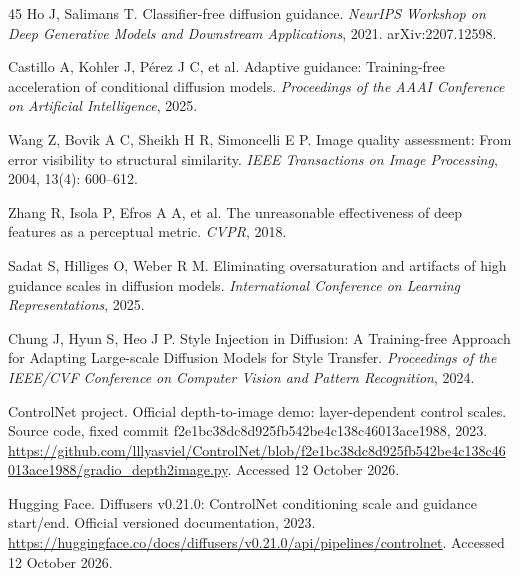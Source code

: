 \documentclass[times,twocolumn,final]{elsarticle}
\begin{document}
\begin{thebibliography}{45}
Ho J, Salimans T. Classifier-free diffusion guidance. \textit{NeurIPS Workshop on Deep Generative Models and Downstream Applications}, 2021. arXiv:2207.12598.

Castillo A, Kohler J, P\'erez J C, et al. Adaptive guidance: Training-free acceleration of conditional diffusion models. \textit{Proceedings of the AAAI Conference on Artificial Intelligence}, 2025.

Wang Z, Bovik A C, Sheikh H R, Simoncelli E P. Image quality assessment: From error visibility to structural similarity. \textit{IEEE Transactions on Image Processing}, 2004, 13(4): 600--612.

Zhang R, Isola P, Efros A A, et al. The unreasonable effectiveness of deep features as a perceptual metric. \textit{CVPR}, 2018.

Sadat S, Hilliges O, Weber R M. Eliminating oversaturation and artifacts of high guidance scales in diffusion models. \textit{International Conference on Learning Representations}, 2025.

Chung J, Hyun S, Heo J P. Style Injection in Diffusion: A Training-free Approach for Adapting Large-scale Diffusion Models for Style Transfer. \textit{Proceedings of the IEEE/CVF Conference on Computer Vision and Pattern Recognition}, 2024.

ControlNet project. Official depth-to-image demo: layer-dependent control scales. Source code, fixed commit f2e1bc38dc8d925fb542be4c138c46013ace1988, 2023. \url{https://github.com/lllyasviel/ControlNet/blob/f2e1bc38dc8d925fb542be4c138c46013ace1988/gradio_depth2image.py}. Accessed 12 October 2026.

Hugging Face. Diffusers v0.21.0: ControlNet conditioning scale and guidance start/end. Official versioned documentation, 2023. \url{https://huggingface.co/docs/diffusers/v0.21.0/api/pipelines/controlnet}. Accessed 12 October 2026.

\end{thebibliography}
\endgroup
\end{document}
